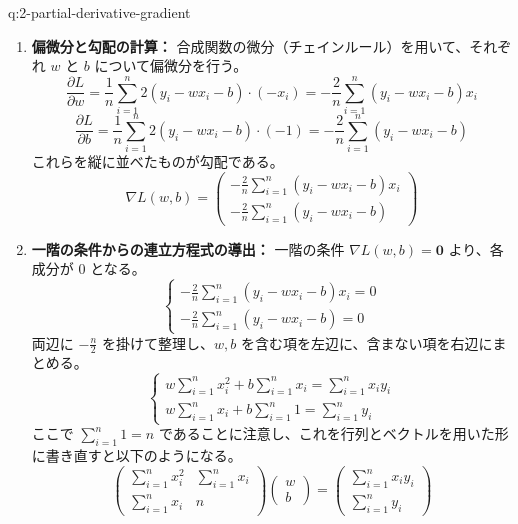 \documentclass[
  pandoc]{bxjsarticle}
\begin{document}
\begin{answerbox}[phantomlabel=a:2-partial-derivative-gradient]{q:2-partial-derivative-gradient}

\begin{enumerate}
\def\labelenumi{\arabic{enumi}.}
\item
  \textbf{偏微分と勾配の計算：}
  合成関数の微分（チェインルール）を用いて、それぞれ \(w\) と \(b\)
  について偏微分を行う。 \[
       \frac{\partial L}{\partial w} = \frac{1}{n} \sum_{i=1}^n 2(y_i - wx_i - b) \cdot (-x_i) = -\frac{2}{n} \sum_{i=1}^n (y_i - wx_i - b)x_i
       \] \[
       \frac{\partial L}{\partial b} = \frac{1}{n} \sum_{i=1}^n 2(y_i - wx_i - b) \cdot (-1) = -\frac{2}{n} \sum_{i=1}^n (y_i - wx_i - b)
       \] これらを縦に並べたものが勾配である。 \[
       \nabla L(w,b) = \begin{pmatrix} -\frac{2}{n} \sum_{i=1}^n (y_i - wx_i - b)x_i \\ -\frac{2}{n} \sum_{i=1}^n (y_i - wx_i - b) \end{pmatrix}
       \]
\item
  \textbf{一階の条件からの連立方程式の導出：} 一階の条件
  \(\nabla L(w,b) = \mathbf{0}\) より、各成分が \(0\) となる。 \[
       \begin{cases}
       -\frac{2}{n} \sum_{i=1}^n (y_i - wx_i - b)x_i = 0 \\
       -\frac{2}{n} \sum_{i=1}^n (y_i - wx_i - b) = 0
       \end{cases}
       \] 両辺に \(-\frac{n}{2}\) を掛けて整理し、\(w, b\)
  を含む項を左辺に、含まない項を右辺にまとめる。 \[
       \begin{cases}
       w \sum_{i=1}^n x_i^2 + b \sum_{i=1}^n x_i = \sum_{i=1}^n x_i y_i \\
       w \sum_{i=1}^n x_i + b \sum_{i=1}^n 1 = \sum_{i=1}^n y_i
       \end{cases}
       \] ここで \(\sum_{i=1}^n 1 = n\)
  であることに注意し、これを行列とベクトルを用いた形に書き直すと以下のようになる。
  \[
       \begin{pmatrix} \sum_{i=1}^n x_i^2 & \sum_{i=1}^n x_i \\ \sum_{i=1}^n x_i & n \end{pmatrix} \begin{pmatrix} w \\ b \end{pmatrix} = \begin{pmatrix} \sum_{i=1}^n x_i y_i \\ \sum_{i=1}^n y_i \end{pmatrix}
\]
\end{enumerate}
\end{answerbox}
\end{document}
